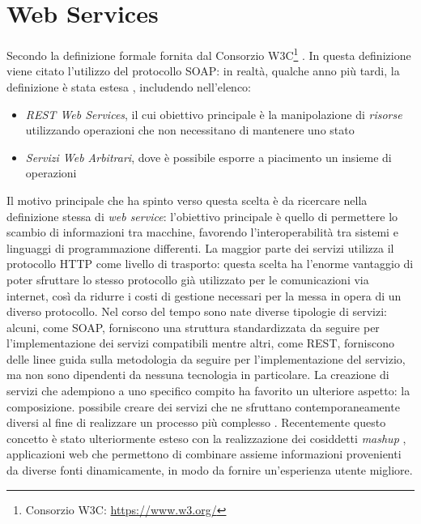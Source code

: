 \section{Web Services\label{sec:web-services}}

Secondo la definizione formale fornita dal Consorzio W3C\footnote{Consorzio W3C: \url{https://www.w3.org/}}  \cite{world2004web}. In questa definizione viene citato l'utilizzo del protocollo SOAP: in realtà, qualche anno più tardi, la definizione è stata estesa \cite{w3c2004web}, includendo nell'elenco:

\begin{itemize}
	\item \emph{REST Web Services}, il cui obiettivo principale è la manipolazione di \emph{risorse} utilizzando operazioni che non necessitano di mantenere uno stato
	\item \emph{Servizi Web Arbitrari}, dove è possibile esporre a piacimento un insieme di operazioni
\end{itemize}

Il motivo principale che ha spinto verso questa scelta è da ricercare nella definizione stessa di \emph{web service}: l'obiettivo principale è quello di permettere lo scambio di informazioni tra macchine, favorendo l'interoperabilità tra sistemi e linguaggi di programmazione differenti. La maggior parte dei servizi utilizza il protocollo HTTP come livello di trasporto: questa scelta ha l'enorme vantaggio di poter sfruttare lo stesso protocollo già utilizzato per le comunicazioni via internet, così da ridurre i costi di gestione necessari per la messa in opera di un diverso protocollo. Nel corso del tempo sono nate diverse tipologie di servizi: alcuni, come SOAP, forniscono una struttura standardizzata da seguire per l'implementazione dei servizi compatibili mentre altri, come REST, forniscono delle linee guida sulla metodologia da seguire per l'implementazione del servizio, ma non sono dipendenti da nessuna tecnologia in particolare. La creazione di servizi che adempiono a uno specifico compito ha favorito un ulteriore aspetto: la composizione. \upe possibile creare dei servizi che ne sfruttano contemporaneamente diversi al fine di realizzare un processo più complesso \cite{weerawarana2005web}. Recentemente questo concetto è stato ulteriormente esteso con la realizzazione dei cosiddetti \emph{mashup} \cite{benslimane2008services}, applicazioni web che permettono di combinare assieme informazioni provenienti da diverse fonti dinamicamente, in modo da fornire un'esperienza utente migliore.

